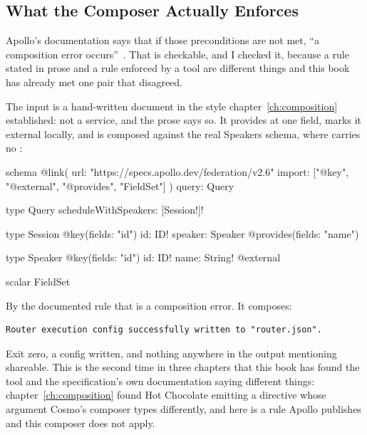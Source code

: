 \subsection{What the Composer Actually Enforces}

%
Apollo's documentation says that if those preconditions are not met,
\enquote{a composition error occurs}~\autocite{apollodirectives}. That is
checkable, and I checked it, because a rule stated in prose and a rule enforced
by a tool are different things and this book has already met one pair that
disagreed.

%
The input is a hand-written document in the style
chapter~\ref{ch:composition} established: not a service, and the prose says so.
It provides  at one field, marks it external locally, and is
composed against the real Speakers schema, where  carries no
:

\begin{graphqlsdl}
schema
  @link(
    url: "https://specs.apollo.dev/federation/v2.6"
    import: ["@key", "@external", "@provides", "FieldSet"]
  ) {
  query: Query
}

type Query {
  scheduleWithSpeakers: [Session!]!
}

type Session @key(fields: "id") {
  id: ID!
  speaker: Speaker @provides(fields: "name")
}

type Speaker @key(fields: "id") {
  id: ID!
  name: String! @external
}

scalar FieldSet
\end{graphqlsdl}

%
By the documented rule that is a composition error. It composes:

\begin{verbatim}
Router execution config successfully written to "router.json".
\end{verbatim}

%
Exit zero, a config written, and nothing anywhere in the output mentioning
shareable. This is the second time in three chapters that this book has found
the tool and the specification's own documentation saying different things:
chapter~\ref{ch:composition} found Hot Chocolate emitting a 
directive whose argument Cosmo's composer types differently, and here is a rule
Apollo publishes and this composer does not apply.


